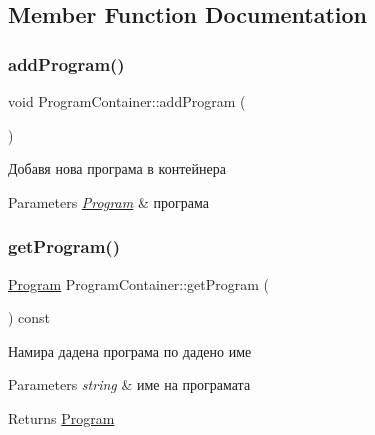 \subsection{Member Function Documentation}
\mbox{\label{class_program_container_a9328196abac3c41551714de458faa75a}} 
\subsubsection{\texorpdfstring{add\+Program()}{addProgram()}}
{\footnotesize\ttfamily void Program\+Container\+::add\+Program (\begin{DoxyParamCaption}\item[{const \hyperlink{class_program}{Program} \&}]{ }\end{DoxyParamCaption})}



Добавя нова програма в контейнера 


\begin{DoxyParams}{Parameters}
{\em \hyperlink{class_program}{Program}} & програма \\
\hline
\end{DoxyParams}
\mbox{\label{class_program_container_ab43924ef5c4933e74e362d9bb0902ece}} 
\subsubsection{\texorpdfstring{get\+Program()}{getProgram()}}
{\footnotesize\ttfamily \hyperlink{class_program}{Program} Program\+Container\+::get\+Program (\begin{DoxyParamCaption}\item[{const std\+::string \&}]{ }\end{DoxyParamCaption}) const}



Намира дадена програма по дадено име 


\begin{DoxyParams}{Parameters}
{\em string} & име на програмата \\
\hline
\end{DoxyParams}
\begin{DoxyReturn}{Returns}
\hyperlink{class_program}{Program} 
\end{DoxyReturn}
\mbox{\label{class_program_container_a2a4ab6a0e5eb941af91ac0644d569bab}} 

